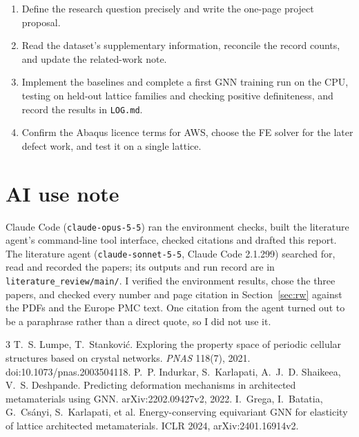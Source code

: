 \documentclass[11pt]{article}
\begin{document}
\begin{enumerate}
  \item Define the research question precisely and write the one-page project proposal.
  \item Read the dataset's supplementary information, reconcile the record counts, and update the
        related-work note.
  \item Implement the baselines and complete a first GNN training run on the CPU, testing on
        held-out lattice families and checking positive definiteness, and record the results in \texttt{LOG.md}.
  \item Confirm the Abaqus licence terms for AWS, choose the FE solver for the later defect work,
        and test it on a single lattice.
\end{enumerate}

\section{AI use note}

Claude Code (\texttt{claude-opus-5-5}) ran the environment checks, built the literature agent's
command-line tool interface, checked citations and drafted this report. The literature agent
(\texttt{claude-sonnet-5-5}, Claude Code 2.1.299) searched for, read and recorded the papers; its
outputs and run record are in \texttt{literature\_review/main/}. I verified the environment
results, chose the three papers, and checked every number and page citation in
Section~\ref{sec:rw} against the PDFs and the Europe PMC text. One citation from the agent turned
out to be a paraphrase rather than a direct quote, so I did not use it.

\begin{thebibliography}{3}\small
{} T.~S. Lumpe, T.~Stankovi\'c. Exploring the property space of periodic cellular
  structures based on crystal networks. \emph{PNAS} 118(7), 2021. doi:10.1073/pnas.2003504118.
 P.~P. Indurkar, S.~Karlapati, A.~J.~D. Shaikeea, V.~S. Deshpande. Predicting
  deformation mechanisms in architected metamaterials using GNN. arXiv:2202.09427v2, 2022.
 I.~Grega, I.~Batatia, G.~Cs\'anyi, S.~Karlapati, et al. Energy-conserving
  equivariant GNN for elasticity of lattice architected metamaterials. ICLR 2024,
  arXiv:2401.16914v2.
\end{thebibliography}
\end{document}
